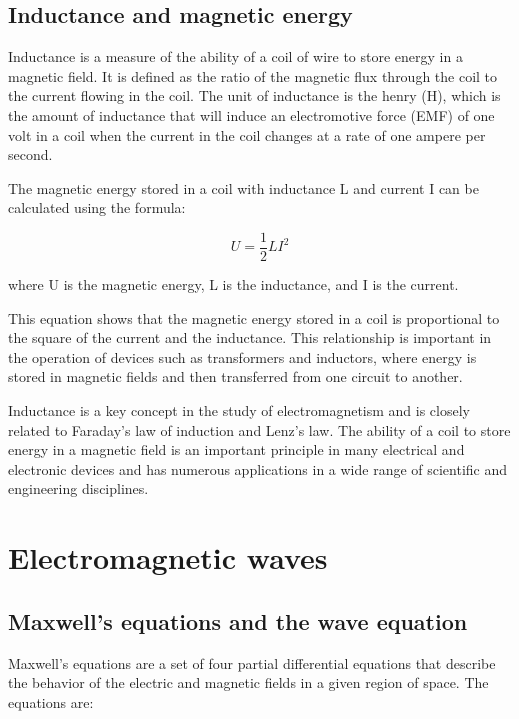 \documentclass{article}
\begin{document}
\subsection{Inductance and magnetic energy} %
\label{ssub:Inductance and magnetic energy}
Inductance is a measure of the ability of a coil of wire to store energy in a
magnetic field. It is defined as the ratio of the magnetic flux through the
coil to the current flowing in the coil. The unit of inductance is the henry
(H), which is the amount of inductance that will induce an electromotive force
(EMF) of one volt in a coil when the current in the coil changes at a rate of
one ampere per second.

The magnetic energy stored in a coil with inductance L and current I can be
calculated using the formula:

\[U = \frac{1}{2} LI^2\]

where U is the magnetic energy, L is the inductance, and I is the current.

This equation shows that the magnetic energy stored in a coil is proportional
to the square of the current and the inductance. This relationship is important
in the operation of devices such as transformers and inductors, where energy is
stored in magnetic fields and then transferred from one circuit to another.

Inductance is a key concept in the study of electromagnetism and is closely
related to Faraday's law of induction and Lenz's law. The ability of a coil to
store energy in a magnetic field is an important principle in many electrical
and electronic devices and has numerous applications in a wide range of
scientific and engineering disciplines.
\section{Electromagnetic waves} %
\label{sec:Electromagnetic waves}
\subsection{Maxwell's equations and the wave equation} %
\label{ssub:Maxwell's equations and the wave equation}
Maxwell's equations are a set of four partial differential equations that describe the behavior of the electric and magnetic fields in a given region of space. The equations are:
\end{document}
